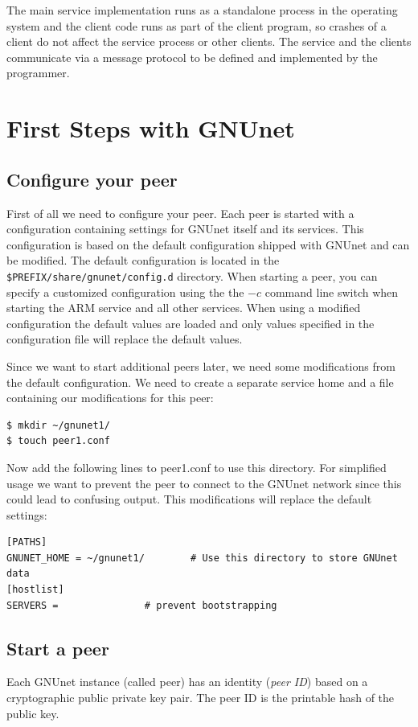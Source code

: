 \documentclass[10pt]{article}
\begin{document}
The main service implementation runs as a standalone process in the operating
system and the client code runs as part of the client program, so crashes of a
client do not affect the service process or other clients. The service and the
clients communicate via a message protocol to be defined and implemented by
the programmer.


\section{First Steps with GNUnet}

\subsection{Configure your peer}

First of all we need to configure your peer. Each peer is started with a configuration containing settings for GNUnet itself and its services. This configuration is based on the default configuration shipped with GNUnet and can be modified. The default configuration is located in the {\tt \$PREFIX/share/gnunet/config.d} directory. When starting a peer, you can specify a customized configuration using the the {\tt$-c$} command line switch when starting the ARM service and all other services. When using a modified configuration the default values are loaded and only values specified in the configuration file will replace the default values.

Since we want to start additional peers later, we need
some modifications from the default configuration. We need to create a separate service home and a file containing our modifications for this peer:
\lstset{language=bash}
\begin{lstlisting}
$ mkdir ~/gnunet1/
$ touch peer1.conf
\end{lstlisting}

Now add the following lines to peer1.conf to use this directory. For
simplified usage we want to prevent the peer to connect to the GNUnet
network since this could lead to confusing output. This modifications
will replace the default settings:
\begin{verbatim}
[PATHS]
GNUNET_HOME = ~/gnunet1/		# Use this directory to store GNUnet data
[hostlist]
SERVERS =				# prevent bootstrapping
\end{verbatim}


\subsection{Start a peer}
Each GNUnet instance (called peer) has an identity (\textit{peer ID}) based on a
cryptographic public private key pair. The peer ID is the printable hash of the
public key.
\end{document}
